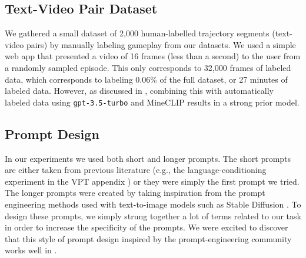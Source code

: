 \subsection{Text-Video Pair Dataset}

We gathered a small dataset of 2,000 human-labelled trajectory segments (text-video pairs) by manually labeling gameplay from our datasets. We used a simple web app that presented a video of 16 frames (less than a second) to the user from a randomly sampled episode. This only corresponds to 32,000 frames of labeled data, which corresponds to labeling 0.06\% of the full dataset, or 27 minutes of labeled data. However, as discussed in , combining this with automatically labeled data using \texttt{gpt-3.5-turbo} and MineCLIP results in a strong prior model.

\subsection{Prompt Design}

In our experiments we used both short and longer prompts. The short prompts are either taken from previous literature (e.g., the language-conditioning experiment in the VPT appendix \citep{baker2022vpt}) or they were simply the first prompt we tried. The longer prompts were created by taking inspiration from the prompt engineering methods used with text-to-image models such as Stable Diffusion \citep{rombach2022ldm}. To design these prompts, we simply strung together a lot of terms related to our task in order to increase the specificity of the prompts. We were excited to discover that this style of prompt design inspired by the prompt-engineering community works well in \agentname{}.